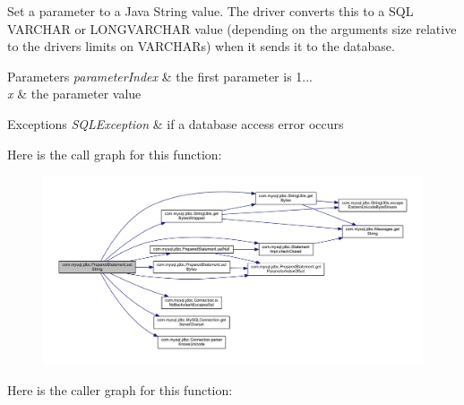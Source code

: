 Set a parameter to a Java String value. The driver converts this to a S\+QL V\+A\+R\+C\+H\+AR or L\+O\+N\+G\+V\+A\+R\+C\+H\+AR value (depending on the arguments size relative to the driver\textquotesingle{}s limits on V\+A\+R\+C\+H\+A\+Rs) when it sends it to the database.


\begin{DoxyParams}{Parameters}
{\em parameter\+Index} & the first parameter is 1... \\
\hline
{\em x} & the parameter value\\
\hline
\end{DoxyParams}

\begin{DoxyExceptions}{Exceptions}
{\em S\+Q\+L\+Exception} & if a database access error occurs \\
\hline
\end{DoxyExceptions}
Here is the call graph for this function\+:
\nopagebreak
\begin{figure}[H]
\begin{center}
\leavevmode
\includegraphics[width=350pt]{classcom_1_1mysql_1_1jdbc_1_1_prepared_statement_a0a4c13284de8a0257085966284a41f1d_cgraph}
\end{center}
\end{figure}
Here is the caller graph for this function\+:
\nopagebreak
